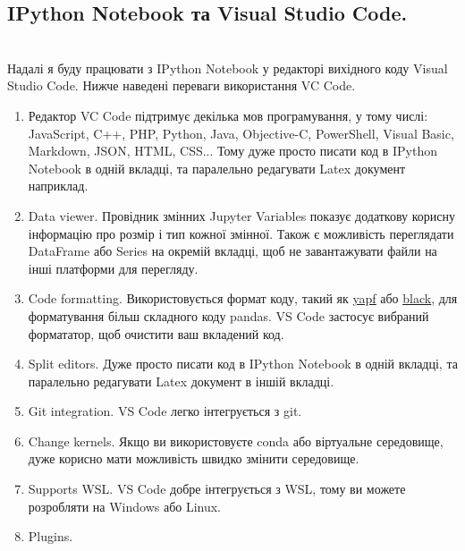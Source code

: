 \documentclass[a4paper,12pt]{article}
\begin{document}
    \subsection{IPython Notebook та Visual Studio Code.}
    \hrulefill \\
    Надалі я буду працювати з IPython Notebook у редакторі вихідного коду Visual Studio Code. Нижче наведені переваги використання VC Code.
    \begin{enumerate}
        \item Редактор VC Code підтримує декілька мов програмування, у тому числі: JavaScript, C++, PHP, Python, Java, Objective-C, PowerShell,
        Visual Basic, Markdown, JSON, HTML, CSS... Тому дуже просто писати код в IPython Notebook в одній вкладці, та паралельно редагувати Latex документ наприклад.
        \item Data viewer. Провідник змінних Jupyter Variables показує додаткову корисну інформацію про розмір і тип кожної змінної. 
        Також є можливість переглядати DataFrame або Series на окремій вкладці, щоб не завантажувати файли на інші платформи для перегляду.
        \item Code formatting. Використовується формат коду, такий як \href{https://github.com/google/yapf}{\underline{yapf}} або 
        \href{https://github.com/psf/black}{\underline{black}}, для форматування більш складного коду pandas. 
        VS Code застосує вибраний формататор, щоб очистити ваш вкладений код.
        \item Split editors. Дуже просто писати код в IPython Notebook в одній вкладці, та паралельно редагувати Latex документ в іншій вкладці.
        \item Git integration. VS Code легко інтегрується з git.
        \item Change kernels. Якщо ви використовуєте conda або віртуальне середовище, дуже корисно мати можливість швидко змінити середовище.
        \item Supports WSL. VS Code добре інтегрується з WSL, тому ви можете розробляти на Windows або Linux.
        \item Plugins. 
    \end{enumerate}
\newpage
\end{document}
